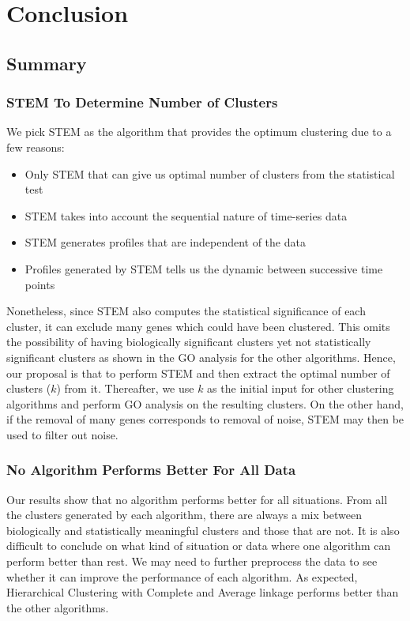 
\chapter{Conclusion}
\setlength{\belowdisplayskip}{1pt} \setlength{\belowdisplayshortskip}{1pt}
\setlength{\abovedisplayskip}{1pt} \setlength{\abovedisplayshortskip}{1pt}
\section{Summary}
\subsection{STEM To Determine Number of Clusters}
We pick STEM as the algorithm that provides the optimum clustering due to a few reasons:
\begin{itemize}
	\item Only STEM that can give us optimal number of clusters from the statistical test
	\item STEM takes into account the sequential nature of time-series data
	\item STEM generates profiles that are independent of the data
	\item Profiles generated by STEM tells us the dynamic between successive time points
\end{itemize}
Nonetheless, since STEM also computes the statistical significance of each cluster, it can exclude many genes which could have been clustered. This omits the possibility of having biologically significant clusters yet not statistically significant clusters as shown in the GO analysis for the other algorithms. Hence, our proposal is that to perform STEM and then extract the optimal number of clusters ($k$) from it. Thereafter, we use $k$ as the initial input for other clustering algorithms and perform GO analysis on the resulting clusters. On the other hand, if the removal of many genes corresponds to removal of noise, STEM may then be used to filter out noise.

\subsection{No Algorithm Performs Better For All Data}
Our results show that no algorithm performs better for all situations. From all the clusters generated by each algorithm, there are always a mix between biologically and statistically meaningful clusters and those that are not. It is also difficult to conclude on what kind of situation or data where one algorithm can perform better than rest. We may need to further preprocess the data to see whether it can improve the performance of each algorithm. As expected, Hierarchical Clustering with Complete and Average linkage performs better than the other algorithms.

